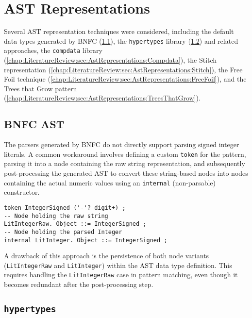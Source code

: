 \section{AST Representations}
\label{sec:AstRepresentations}

Several AST representation techniques were considered, including the default data types generated by BNFC (\cref{chap:LiteratureReview:sec:AstRepresentations:BnfcAst}), the \texttt{hypertypes} library (\cref{chap:LiteratureReview:sec:AstRepresentations:Hypertypes}) and related approaches, the \texttt{compdata} library (\cref{chap:LiteratureReview:sec:AstRepresentations:Compdata}), the Stitch representation (\cref{chap:LiteratureReview:sec:AstRepresentations:Stitch}), the Free Foil technique (\cref{chap:LiteratureReview:sec:AstRepresentations:FreeFoil}), and the Trees that Grow pattern (\cref{chap:LiteratureReview:sec:AstRepresentations:TreesThatGrow}).

\subsection{BNFC AST}
\label{chap:LiteratureReview:sec:AstRepresentations:BnfcAst}

The parsers generated by BNFC do not directly support parsing signed integer literals. A common workaround involves defining a custom \texttt{token} for the pattern, parsing it into a node containing the raw string representation, and subsequently post-processing the generated AST to convert these string-based nodes into nodes containing the actual numeric values using an \texttt{internal} (non-parsable) constructor.

\begin{verbatim}
token IntegerSigned ('-'? digit+) ;
-- Node holding the raw string
LitIntegerRaw. Object ::= IntegerSigned ;
-- Node holding the parsed Integer
internal LitInteger. Object ::= IntegerSigned ;
\end{verbatim}

A drawback of this approach is the persistence of both node variants (\texttt{LitIntegerRaw} and \texttt{LitInteger}) within the AST data type definition. This requires handling the \texttt{LitIntegerRaw} case in pattern matching, even though it becomes redundant after the post-processing step.

\subsection{\texttt{hypertypes}}
\label{chap:LiteratureReview:sec:AstRepresentations:Hypertypes}

